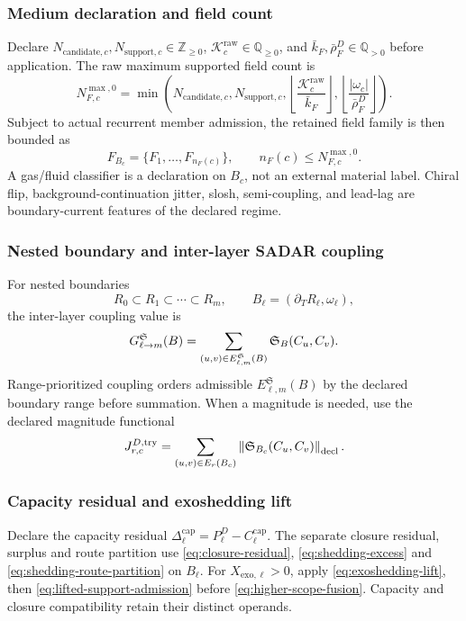 \subsubsection{Medium declaration and field count}\label{subsec:medium-declaration-field-count}
Declare \(N_{\mathrm{candidate},c},N_{\mathrm{support},c}\in\mathbb Z_{\ge0}\), \(\mathcal K^{\mathrm{raw}}_c\in\mathbb Q_{\ge0}\), and \(\bar k_F,\bar\rho^D_F\in\mathbb Q_{>0}\) before application. The raw maximum supported field count is
\[
N^{\max,0}_{F,c}
=
\min\left(
N_{\mathrm{candidate},c},
N_{\mathrm{support},c},
\left\lfloor\frac{\mathcal K^{\mathrm{raw}}_c}{\bar k_F}\right\rfloor,
\left\lfloor\frac{|\omega_c|}{\bar\rho^D_F}\right\rfloor
\right).
\]
Subject to actual recurrent member admission, the retained field family is then bounded as
\[
F_{B_c}=\{F_1,\ldots,F_{n_F(c)}\},
\qquad
n_F(c)\le N^{\max,0}_{F,c}.
\]
A gas/fluid classifier is a declaration on \(B_c\), not an external material label. Chiral flip, background-continuation jitter, slosh, semi-coupling, and lead-lag are boundary-current features of the declared regime.



\subsubsection{Nested boundary and inter-layer SADAR coupling}\label{subsec:interlayer-sadar-coupling}
For nested boundaries
\[
R_0\subset R_1\subset\cdots\subset R_m,
\qquad
B_\ell=(\partial_T R_\ell,\omega_\ell),
\]
the inter-layer coupling value is
\[
G^{\mathfrak S}_{\ell\to m}(B)
=
\sum_{(u,v)\in E^{\mathfrak S}_{\ell,m}(B)}
\mathfrak S_B(C_u,C_v).
\]
Range-prioritized coupling orders admissible \(E^{\mathfrak S}_{\ell,m}(B)\) by the declared boundary range before summation. When a magnitude is needed, use the declared magnitude functional
\[
J^{D,\mathrm{try}}_{r,c}
=
\sum_{(u,v)\in E_r(B_c)}
\left\|\mathfrak S_{B_c}(C_u,C_v)\right\|_{\mathrm{decl}}.
\]

\subsubsection{Capacity residual and exoshedding lift}\label{subsec:capacity-residual-exoshedding-lift}
Declare the capacity residual \(\Delta^{\mathrm{cap}}_\ell=P^D_\ell-C^{\mathrm{cap}}_\ell\).
The separate closure residual, surplus and route partition use
\eqref{eq:closure-residual}, \eqref{eq:shedding-excess} and
\eqref{eq:shedding-route-partition} on \(B_\ell\).
For \(X_{\mathrm{exo},\ell}>0\), apply \eqref{eq:exoshedding-lift},
then \eqref{eq:lifted-support-admission} before
\eqref{eq:higher-scope-fusion}. Capacity and closure compatibility retain
their distinct operands.

